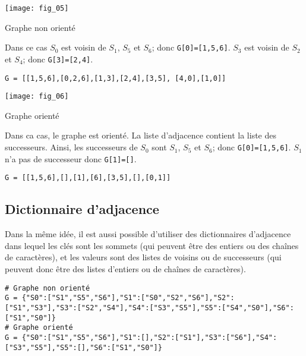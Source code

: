 \vspace{1cm}

\begin{marginfigure}
\texttt{[image: fig\_05]}
\caption{Graphe non orienté}
\end{marginfigure}

\begin{exemple}
Dans ce cas $S_0$ est voisin de $S_1$, $S_5$ et $S_6$; donc \texttt{G[0]=[1,5,6]}. 
$S_3$ est voisin de $S_2$ et $S_4$; donc \texttt{G[3]=[2,4]}.
\begin{lstlisting}
G = [[1,5,6],[0,2,6],[1,3],[2,4],[3,5], [4,0],[1,0]]
\end{lstlisting}
\end{exemple}

\vspace{1cm}

\begin{marginfigure}
\texttt{[image: fig\_06]}
\caption{Graphe orienté}
\end{marginfigure}

\begin{exemple} 
Dans ca cas, le graphe est orienté. La liste d'adjacence contient la liste des successeurs. Ainsi, les successeurs de $S_0$ sont $S_1$, $S_5$ et $S_6$; donc \texttt{G[0]=[1,5,6]}. $S_1$ n'a pas de successeur donc \texttt{G[1]=[]}.
\begin{lstlisting}
G = [[1,5,6],[],[1],[6],[3,5],[],[0,1]]
\end{lstlisting}
\end{exemple}


\subsection{Dictionnaire d'adjacence}

Dans la même idée, il est aussi possible d'utiliser des dictionnaires d'adjacence dans lequel les clés sont les sommets (qui peuvent être des entiers ou des chaînes de caractères), et les valeurs sont des listes de voisins ou de successeurs (qui peuvent donc être des listes d'entiers ou de chaînes de caractères).

\begin{lstlisting}
# Graphe non orienté 
G = {"S0":["S1","S5","S6"],"S1":["S0","S2","S6"],"S2":["S1","S3"],"S3":["S2","S4"],"S4":["S3","S5"],"S5":["S4","S0"],"S6":["S1","S0"]}
# Graphe orienté 
G = {"S0":["S1","S5","S6"],"S1":[],"S2":["S1"],"S3":["S6"],"S4":["S3","S5"],"S5":[],"S6":["S1","S0"]}
\end{lstlisting}

